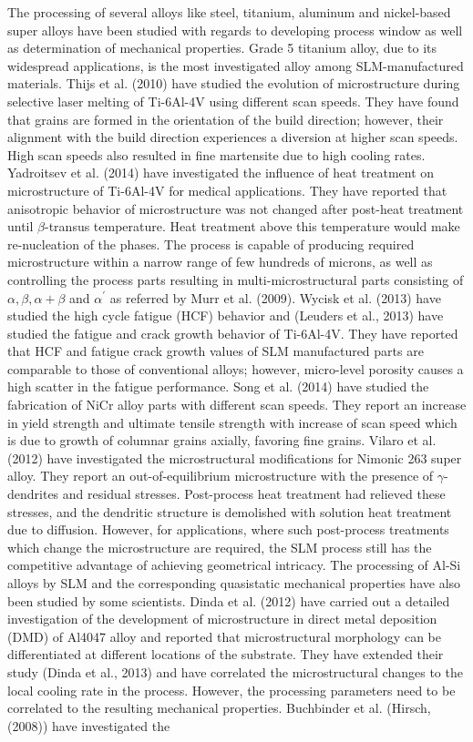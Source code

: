 \documentclass[10pt]{article}
\begin{document}
The processing of several alloys like steel, titanium, aluminum and nickel-based super alloys have been studied with regards to developing process window as well as determination of mechanical properties. Grade 5 titanium alloy, due to its widespread applications, is the most investigated alloy among SLM-manufactured\\
materials. Thijs et al. (2010) have studied the evolution of microstructure during selective laser melting of Ti-6Al-4V using different scan speeds. They have found that grains are formed in the orientation of the build direction; however, their alignment with the build direction experiences a diversion at higher scan speeds. High scan speeds also resulted in fine martensite due to high cooling rates. Yadroitsev et al. (2014) have investigated the influence of heat treatment on microstructure of Ti-6Al-4V for medical applications. They have reported that anisotropic behavior of microstructure was not changed after post-heat treatment until $\beta$-transus temperature. Heat treatment above this temperature would make re-nucleation of the phases. The process is capable of producing required microstructure within a narrow range of few hundreds of microns, as well as controlling the process parts resulting in multi-microstructural parts consisting of $\alpha, \beta, \alpha+\beta$ and $\alpha^{\prime}$ as referred by Murr et al. (2009). Wycisk et al. (2013) have studied the high cycle fatigue (HCF) behavior and (Leuders et al., 2013) have studied the fatigue and crack growth behavior of Ti-6Al-4V. They have reported that HCF and fatigue crack growth values of SLM manufactured parts are comparable to those of conventional alloys; however, micro-level porosity causes a high scatter in the fatigue performance. Song et al. (2014) have studied the fabrication of $\mathrm{NiCr}$ alloy parts with different scan speeds. They report an increase in yield strength and ultimate tensile strength with increase of scan speed which is due to growth of columnar grains axially, favoring fine grains. Vilaro et al. (2012) have investigated the microstructural modifications for Nimonic 263 super alloy. They report an out-of-equilibrium microstructure with the presence of $\gamma$-dendrites and residual stresses. Post-process heat treatment had relieved these stresses, and the dendritic structure is demolished with solution heat treatment due to diffusion. However, for applications, where such post-process treatments which change the microstructure are required, the SLM process still has the competitive advantage of achieving geometrical intricacy. The processing of Al-Si alloys by SLM and the corresponding quasistatic mechanical properties have also been studied by some scientists. Dinda et al. (2012) have carried out a detailed investigation of the development of microstructure in direct metal deposition (DMD) of Al4047 alloy and reported that microstructural morphology can be differentiated at different locations of the substrate. They have extended their study (Dinda et al., 2013) and have correlated the microstructural changes to the local cooling rate in the process. However, the processing parameters need to be correlated to the resulting mechanical properties. Buchbinder et al. (Hirsch, (2008)) have investigated the 
\end{document}
